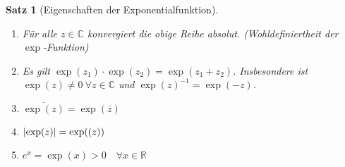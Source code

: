 \documentclass[11pt, twoside, a4paper]{article}
\theoremstyle{plain}
\newtheorem{satz}[blockelement]{Satz}
\newcommand{\abs}[1]{\left\lvert#1\right\rvert}
\newcommand{\conj}[1]{\overline{#1}}
\newcommand{\theoremescape}{\leavevmode}
\let\Re\relax
\DeclareMathOperator{\Re}{Re}
\newcommand{\R}{\mathbb{R}}
\newcommand{\C}{\mathbb{C}}
\begin{document}
    \begin{satz}[Eigenschaften der Exponentialfunktion]
        \theoremescape
        \begin{enumerate}[label=(\alph*)]
            \item Für alle $z\in\C$ konvergiert die obige Reihe absolut. (Wohldefiniertheit der $\exp$-Funktion)
            \item Es gilt $\exp(z_1)\cdot\exp(z_2) = \exp(z_1+z_2)$. Insbesondere ist $\exp(z)\neq 0~\forall z\in\C$ und $\exp(z)^{-1} = \exp(-z)$.
            \item $\conj{\exp(z)} = \exp(\conj{z})$
            \item $\abs{\exp(z)} = \exp(\Re(z))$
            \item $e^x = \exp(x) > 0\quad\forall x\in\R$
        \end{enumerate}


\end{satz}
\end{document}
